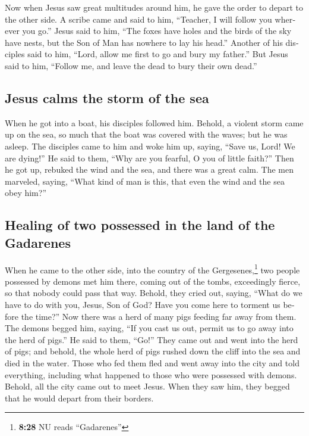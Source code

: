 \begin{paracol}{2}
\begin{otherlanguage}{english}
 Now when Jesus saw great multitudes around him, he gave
the order to depart to the other side.  A scribe came and
said to him, ``Teacher, I will follow you wherever you go.''
 Jesus said to him, ``The foxes have holes and the birds
of the sky have nests, but the Son of Man has nowhere to lay his head.''
 Another of his disciples said to him, ``Lord, allow me
first to go and bury my father.''  But Jesus said to him,
``Follow me, and leave the dead to bury their own dead.''

\hypertarget{jesus-calms-the-storm-of-the-sea}{%
\subsection{Jesus calms the storm of the
sea}\label{jesus-calms-the-storm-of-the-sea}}

 When he got into a boat, his disciples followed him.
 Behold, a violent storm came up on the sea, so much that
the boat was covered with the waves; but he was asleep. 
The disciples came to him and woke him up, saying, ``Save us, Lord! We
are dying!''  He said to them, ``Why are you fearful, O
you of little faith?'' Then he got up, rebuked the wind and the sea, and
there was a great calm.  The men marveled, saying, ``What
kind of man is this, that even the wind and the sea obey him?''

\hypertarget{healing-of-two-possessed-in-the-land-of-the-gadarenes}{%
\subsection{Healing of two possessed in the land of the
Gadarenes}\label{healing-of-two-possessed-in-the-land-of-the-gadarenes}}

 When he came to the other side, into the country of the
Gergesenes,\footnote{\textbf{8:28} NU reads ``Gadarenes''} two people
possessed by demons met him there, coming out of the tombs, exceedingly
fierce, so that nobody could pass that way.  Behold, they
cried out, saying, ``What do we have to do with you, Jesus, Son of God?
Have you come here to torment us before the time?''  Now
there was a herd of many pigs feeding far away from them.
 The demons begged him, saying, ``If you cast us out,
permit us to go away into the herd of pigs.''  He said to
them, ``Go!'' They came out and went into the herd of pigs; and behold,
the whole herd of pigs rushed down the cliff into the sea and died in
the water.  Those who fed them fled and went away into
the city and told everything, including what happened to those who were
possessed with demons.  Behold, all the city came out to
meet Jesus. When they saw him, they begged that he would depart from
their borders.


\end{otherlanguage}
\end{paracol}
